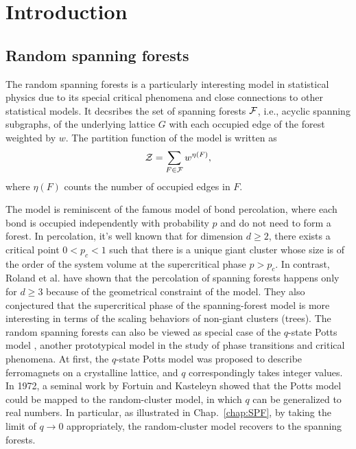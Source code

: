 \chapter{Introduction}\label{chap:intro}

\section{Random spanning forests}
The random spanning forests is a particularly interesting model in statistical physics due to its special critical phenomena
and close connections to other statistical models. It decsribes the set of spanning forests ${\mathcal F}$, i.e., acyclic spanning subgraphs, of the underlying
lattice $G$ with each occupied edge of the forest weighted by $w$. The partition function of the model is written as
\begin{equation}\label{eq:SPF_partition}
	{\mathcal Z} = \sum_{F \in {\mathcal F}} w^{\eta(F)},
\end{equation}
where $\eta(F)$ counts the number of occupied edges in $F$.

The model is reminiscent of the famous model of bond percolation, where each bond is occupied independently with probability $p$ and do not need to form a forest.
In percolation, it's well known that for dimension $d \geq 2$, there exists a critical point $0 < p_c < 1$ such that there is a unique giant cluster whose size is of the order of the system volume
at the supercritical phase $p > p_c$. In contrast, Roland et al. \cite{Roland2021Percolation} have shown that the percolation of spanning forests happens only for $d \geq 3$ 
because of the geometrical constraint of the model. They also conjectured that the supercritical phase of the spanning-forest model is more interesting in terms of the scaling behaviors of non-giant clusters (trees). 
The random spanning forests can also be viewed as special case of the $q$-state Potts model \cite{Potts1952, Wu1982}, another prototypical model in the study of phase transitions and critical phenomena.
At first, the $q$-state Potts model was proposed to describe ferromagnets on a crystalline lattice, and $q$ correspondingly takes integer values.
In 1972, a seminal work by Fortuin and Kasteleyn \cite{Fortuin1972} showed that the Potts model could be mapped to the random-cluster model, in which $q$ can be 
generalized to real numbers. In particular, as illustrated in Chap.~\ref{chap:SPF}, by taking the limit of $q\to 0$ appropriately,
the random-cluster model recovers to the spanning forests.

